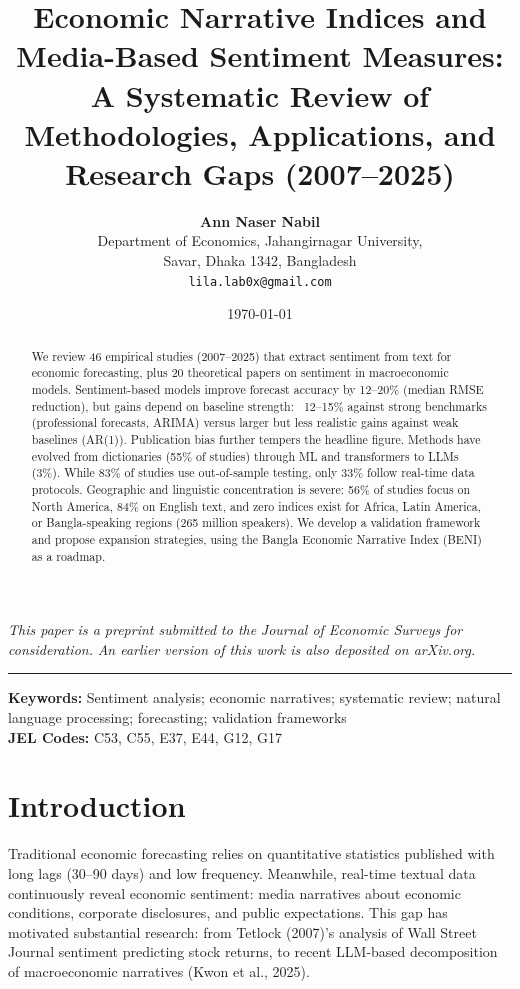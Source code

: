 \documentclass[11pt,twocolumn]{article}
\title{\textbf{Economic Narrative Indices and Media-Based Sentiment Measures:\\
A Systematic Review of Methodologies, Applications, and Research Gaps (2007--2025)}}
\author{\textbf{Ann Naser Nabil}\orcidlink{0009-0006-3561-045X}\\[4pt]
  \small Department of Economics, Jahangirnagar University,\\
  \small Savar, Dhaka 1342, Bangladesh\\
  \small\texttt{lila.lab0x@gmail.com}}
\date{\today}
\begin{document}
\maketitle

\noindent\small\textit{This paper is a preprint submitted to the}
\textit{Journal of Economic Surveys}
\textit{for consideration.}
\textit{An earlier version of this work is also deposited on arXiv.org.}
\par\vspace{0.5em}

\hrule\vspace{1em}

\begin{abstract}
We review 46 empirical studies (2007--2025) that extract sentiment from text for economic forecasting, plus 20 theoretical papers on sentiment in macroeconomic models. Sentiment-based models improve forecast accuracy by 12--20\% (median RMSE reduction), but gains depend on baseline strength: ~12--15\% against strong benchmarks (professional forecasts, ARIMA) versus larger but less realistic gains against weak baselines (AR(1)). Publication bias further tempers the headline figure. Methods have evolved from dictionaries (55\% of studies) through ML and transformers to LLMs (3\%). While 83\% of studies use out-of-sample testing, only 33\% follow real-time data protocols. Geographic and linguistic concentration is severe: 56\% of studies focus on North America, 84\% on English text, and zero indices exist for Africa, Latin America, or Bangla-speaking regions (265 million speakers). We develop a validation framework and propose expansion strategies, using the Bangla Economic Narrative Index (BENI) as a roadmap.
\end{abstract}

\noindent \textbf{Keywords:} Sentiment analysis; economic narratives; systematic review; natural language processing; forecasting; validation frameworks \\
\textbf{JEL Codes:} C53, C55, E37, E44, G12, G17

\section{Introduction}

Traditional economic forecasting relies on quantitative statistics published with long lags (30--90 days) and low frequency. Meanwhile, real-time textual data continuously reveal economic sentiment: media narratives about economic conditions, corporate disclosures, and public expectations. This gap has motivated substantial research: from Tetlock (2007)'s analysis of Wall Street Journal sentiment predicting stock returns, to recent LLM-based decomposition of macroeconomic narratives (Kwon et al., 2025).
\end{document}
